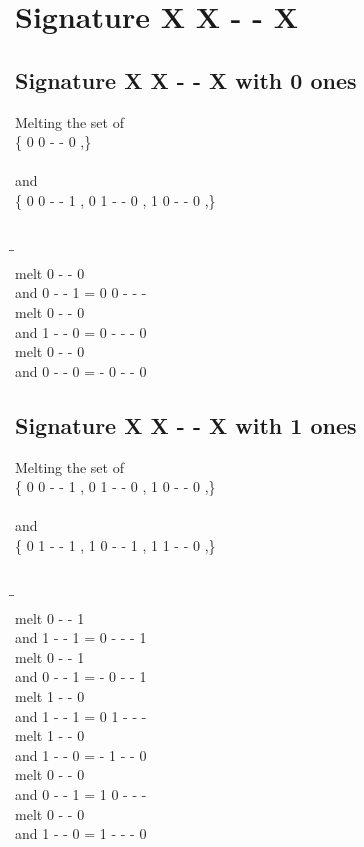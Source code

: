 \documentclass{article}
\begin{document}
\section{Signature X X - - X }
\subsection{Signature X X - - X with 0 ones}
Melting the set of\\
\{ 0  0  -  -  0 ,\}\\\\
and\\
\{ 0  0  -  -  1 , 0  1  -  -  0 , 1  0  -  -  0 ,\}\\\\
\begin{tabbing}
\hspace{3cm}\=\hspace{3cm}\=\hspace{3cm}\\[1cm]
melt  0  -  -  0 \\
and  0  -  -  1 \>
 =  0  0  -  -  - \\[1mm]
melt  0  -  -  0 \\
and  1  -  -  0 \>
 =  0  -  -  -  0 \\[1mm]
melt  0  -  -  0 \\
and  0  -  -  0 \>
 =  -  0  -  -  0 \\[1mm]
\end{tabbing}
\newpage
\subsection{Signature X X - - X with 1 ones}
Melting the set of\\
\{ 0  0  -  -  1 , 0  1  -  -  0 , 1  0  -  -  0 ,\}\\\\
and\\
\{ 0  1  -  -  1 , 1  0  -  -  1 , 1  1  -  -  0 ,\}\\\\
\begin{tabbing}
\hspace{3cm}\=\hspace{3cm}\=\hspace{3cm}\\[1cm]
melt  0  -  -  1 \\
and  1  -  -  1 \>
 =  0  -  -  -  1 \\[1mm]
melt  0  -  -  1 \\
and  0  -  -  1 \>
 =  -  0  -  -  1 \\[1mm]
melt  1  -  -  0 \\
and  1  -  -  1 \>
 =  0  1  -  -  - \\[1mm]
melt  1  -  -  0 \\
and  1  -  -  0 \>
 =  -  1  -  -  0 \\[1mm]
melt  0  -  -  0 \\
and  0  -  -  1 \>
 =  1  0  -  -  - \\[1mm]
melt  0  -  -  0 \\
and  1  -  -  0 \>
 =  1  -  -  -  0 \\[1mm]
\end{tabbing}
\newpage
\end{document}
